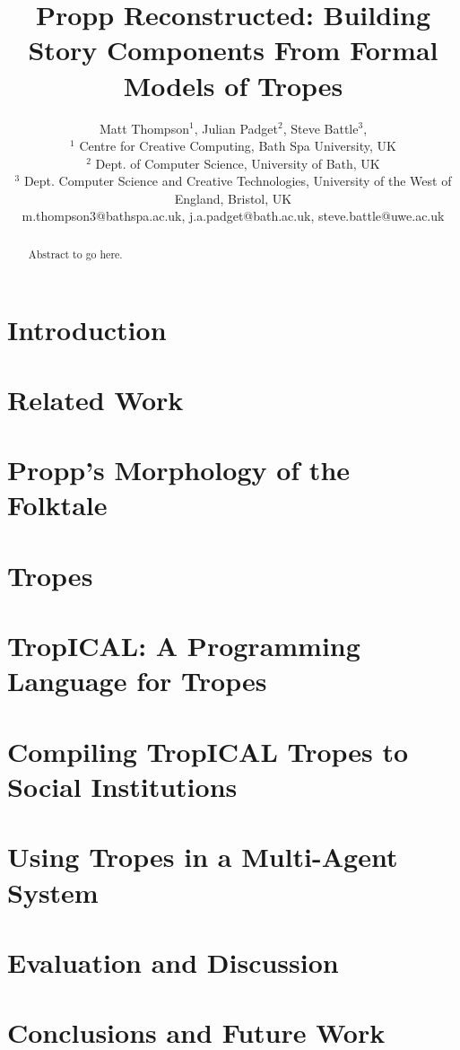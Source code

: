 \documentclass{article}
\title{Propp Reconstructed: Building Story Components From Formal Models of Tropes}
\author{
Matt Thompson$^1$, 
Julian Padget$^2$, 
Steve Battle$^3$, 
\\ 
$^1$ Centre for Creative Computing, Bath Spa University, UK \\
$^2$ Dept. of Computer Science, University of Bath, UK \\
$^3$ Dept. Computer Science and Creative Technologies, University of the West of
England, Bristol, UK \\
%
m.thompson3@bathspa.ac.uk,
j.a.padget@bath.ac.uk,
steve.battle@uwe.ac.uk
}
\begin{document}
\maketitle

\begin{abstract}
  Abstract to go here.
\end{abstract}

\section{Introduction}

\section{Related Work}

\section{Propp's Morphology of the Folktale}

\section{Tropes}

\section{TropICAL: A Programming Language for Tropes}

\section{Compiling TropICAL Tropes to Social Institutions}

\section{Using Tropes in a Multi-Agent System}

\section{Evaluation and Discussion}

\section{Conclusions and Future Work}




\end{document}
